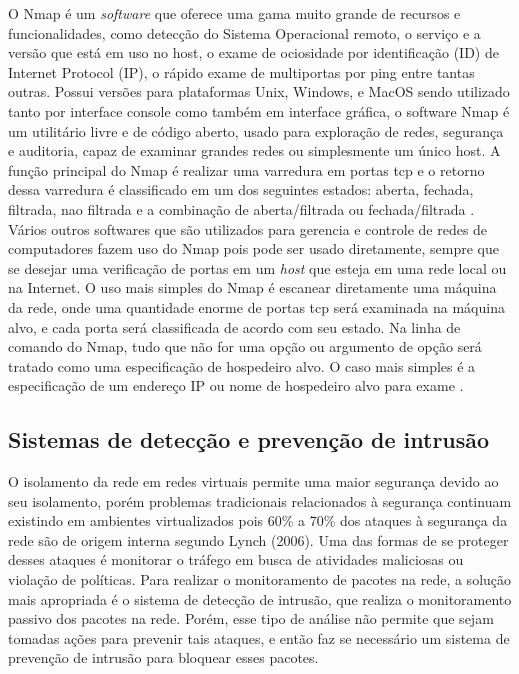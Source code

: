 O Nmap é um \textit{software} que oferece uma gama muito grande de recursos e funcionalidades, como detecção do Sistema Operacional remoto, o serviço e a versão que está em uso no host, o exame de ociosidade por identificação (ID) de Internet Protocol (IP), o rápido exame de multiportas por ping entre tantas outras. Possui versões para plataformas Unix, Windows, e MacOS sendo utilizado tanto por interface console como também em interface gráfica, o software Nmap é um utilitário livre e de código aberto, usado para exploração de redes, segurança e auditoria, capaz de examinar grandes redes ou simplesmente um único host.
A função principal do Nmap é realizar uma varredura em portas \gls{tcp} e o retorno dessa varredura é classificado em um dos seguintes estados: aberta, fechada, filtrada, nao filtrada e a combinação de aberta/filtrada ou fechada/filtrada \cite{Lyon:2009}. Vários outros softwares que são utilizados para gerencia e controle de redes de computadores fazem uso do Nmap pois pode ser usado diretamente, sempre que se desejar uma verificação de portas em um \textit{host} que esteja em uma rede local ou na Internet.
O uso mais simples do Nmap é escanear diretamente uma máquina da rede, onde uma quantidade enorme de portas \gls{tcp} será examinada na máquina alvo, e cada porta será classificada de acordo com seu estado.
Na linha de comando do Nmap, tudo que não for uma opção ou argumento de opção será tratado como uma especificação de hospedeiro alvo. O caso mais simples é a especificação de um endereço IP ou nome de hospedeiro alvo para exame \cite{Lyon:2009}.


\subsection{Sistemas de detecção e prevenção de intrusão}

O isolamento da rede em redes virtuais permite uma maior segurança devido ao seu isolamento, porém problemas tradicionais relacionados à segurança continuam existindo em ambientes virtualizados pois 60\% a 70\% dos ataques à segurança da rede são de origem interna segundo Lynch (2006)\nocite{Lynch:2006}. Uma das formas de se proteger desses ataques é monitorar o tráfego em busca de atividades maliciosas ou violação de políticas. Para realizar o monitoramento de pacotes na rede, a solução mais apropriada é o sistema de detecção de intrusão, que realiza o monitoramento passivo dos pacotes na rede. Porém, esse tipo de análise não permite que sejam tomadas ações para prevenir tais ataques, e então faz se necessário um sistema de prevenção de intrusão para bloquear esses pacotes.


